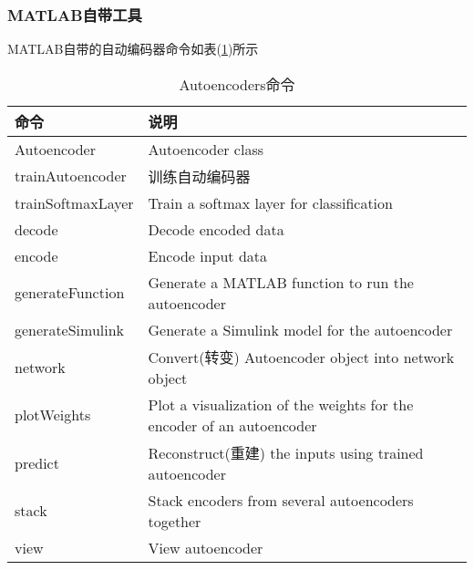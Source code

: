         \subsubsection{MATLAB自带工具}
        \par
        MATLAB自带的自动编码器命令如表(\ref{tab:Autoencoders命令})所示
        \begin{table}[htbp]
          \caption{Autoencoders命令}
          \label{tab:Autoencoders命令}
          \centering
          \begin{tabular}{l|l}
          \toprule
          命令  & 说明 \\
          \midrule
          Autoencoder &  Autoencoder class\\
          trainAutoencoder & 训练自动编码器\\
          trainSoftmaxLayer &  Train a softmax layer for classification\\
          decode & Decode encoded data\\
          encode & Encode input data\\
          generateFunction & Generate a MATLAB function to run the autoencoder\\
          generateSimulink & Generate a Simulink model for the autoencoder\\
          network  & Convert(转变) Autoencoder object into network object\\
          plotWeights &  Plot a visualization of the weights for the encoder of an autoencoder\\
          predict &  Reconstruct(重建) the inputs using trained autoencoder\\
          stack &  Stack encoders from several autoencoders together\\
          view & View autoencoder\\
          \bottomrule
          \end{tabular}
        \end{table}
        \par
